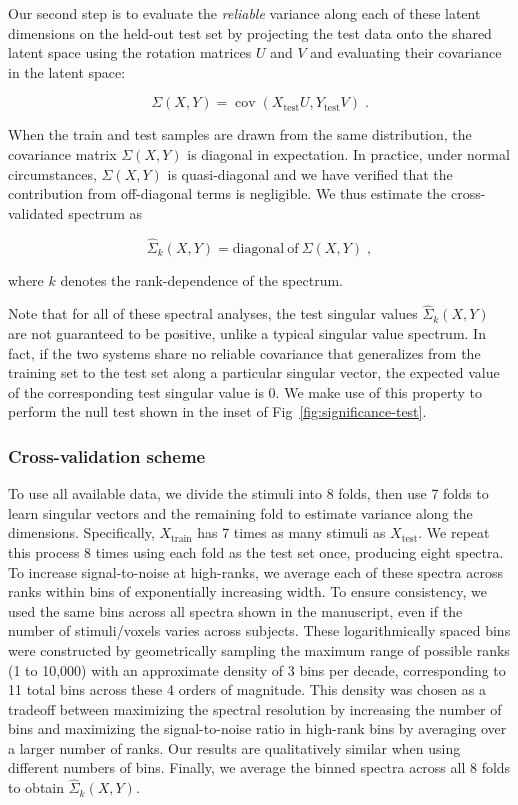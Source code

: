 \documentclass[10pt]{article}
\begin{document}
Our second step is to evaluate the \emph{reliable} variance along each of these latent dimensions on the held-out test set by projecting the test data onto the shared latent space using the rotation matrices \(U\) and \(V\) and evaluating their covariance in the latent space:

\[
\Sigma(X, Y) = \operatorname{cov}
\left(X_\text{test}U, Y_\text{test} V \right)\;.
\]

When the train and test samples are drawn from the same distribution, the covariance matrix \(\Sigma(X, Y)\) is diagonal in expectation. In practice, under normal circumstances, \(\Sigma(X, Y)\) is quasi-diagonal and we have verified that the contribution from off-diagonal terms is negligible. We thus estimate the cross-validated spectrum as

\[
\hat{\Sigma}_k(X, Y) = \mathrm{diagonal~of~}\Sigma(X, Y)\;,
\]

where \(k\) denotes the rank-dependence of the spectrum.

Note that for all of these spectral analyses, the test singular values \(\hat{\Sigma}_k(X, Y)\) are not guaranteed to be positive, unlike a typical singular value spectrum. In fact, if the two systems share no reliable covariance that generalizes from the training set to the test set along a particular singular vector, the expected value of the corresponding test singular value is 0. We make use of this property to perform the null test shown in the inset of Fig~\ref{fig:significance-test}.

\subsubsection{Cross-validation scheme}\label{cross-validation-scheme}

To use all available data, we divide the stimuli into 8 folds, then use 7 folds to learn singular vectors and the remaining fold to estimate variance along the dimensions. Specifically, \(X_\text{train}\) has 7 times as many stimuli as \(X_\text{test}\). We repeat this process 8 times using each fold as the test set once, producing eight spectra. To increase signal-to-noise at high-ranks, we average each of these spectra across ranks within bins of exponentially increasing width. To ensure consistency, we used the same bins across all spectra shown in the manuscript, even if the number of stimuli/voxels varies across subjects. These logarithmically spaced bins were constructed by geometrically sampling the maximum range of possible ranks (1 to 10,000) with an approximate density of 3 bins per decade, corresponding to 11 total bins across these 4 orders of magnitude. This density was chosen as a tradeoff between maximizing the spectral resolution by increasing the number of bins and maximizing the signal-to-noise ratio in high-rank bins by averaging over a larger number of ranks. Our results are qualitatively similar when using different numbers of bins. Finally, we average the binned spectra across all 8 folds to obtain \(\hat{\Sigma}_k(X, Y)\).
\end{document}
